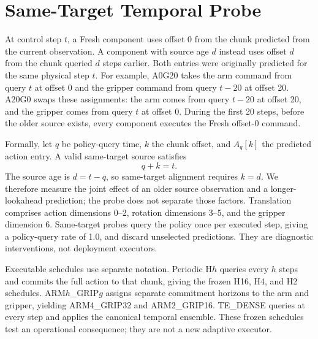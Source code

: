 \section{Same-Target Temporal Probe}
\label{sec:same-target}

At control step $t$, a Fresh component uses offset 0 from the chunk predicted
from the current observation. A component with source age $d$ instead uses
offset $d$ from the chunk queried $d$ steps earlier. Both entries were
originally predicted for the same physical step $t$. For example, A0G20 takes
the arm command from query $t$ at offset 0 and the gripper command from query
$t-20$ at offset 20. A20G0 swaps these assignments: the arm comes from query
$t-20$ at offset 20, and the gripper comes from query $t$ at offset 0. During
the first 20 steps, before the older source exists, every component executes
the Fresh offset-0 command.

Formally, let $q$ be policy-query time, $k$ the chunk offset, and $A_q[k]$
the predicted action entry. A valid same-target source satisfies
\begin{equation}
q + k = t .
\label{eq:same-target}
\end{equation}
The source age is $d=t-q$, so same-target alignment requires $k=d$. We
therefore measure the joint effect of an older source observation and a
longer-lookahead prediction; the probe does not separate those factors.
Translation comprises action dimensions 0--2, rotation dimensions 3--5, and
the gripper dimension 6. Same-target probes query the policy once per executed
step, giving a policy-query rate of 1.0, and discard unselected predictions.
They are diagnostic interventions, not deployment executors.

Executable schedules use separate notation. Periodic H$h$ queries every $h$
steps and commits the full action to that chunk, giving the frozen H16, H4, and
H2 schedules. ARM$h$\_GRIP$g$ assigns separate commitment horizons to the arm
and gripper, yielding ARM4\_GRIP32 and ARM2\_GRIP16. TE\_DENSE queries at every
step and applies the canonical temporal ensemble. These frozen schedules test
an operational consequence; they are not a new adaptive executor.
